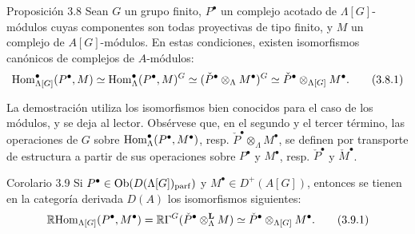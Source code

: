 \begin{statement}{Proposición 3.8}
Sean $G$ un grupo finito, $P^\bullet$ un complejo acotado de $\Lambda[G]$-módulos cuyas componentes son todas proyectivas de tipo finito, y $M$ un complejo de $A[G]$-módulos. En estas condiciones, existen isomorfismos canónicos de complejos de $A$-módulos:
\[
\operatorname{Hom}_{\Lambda[G]}^\bullet(P^\bullet,M)
\simeq \operatorname{Hom}_\Lambda^\bullet(P^\bullet,M)^G
\simeq (\check P^\bullet\otimes_\Lambda M^\bullet)^G
\simeq \check P^\bullet\otimes_{\Lambda[G]}M^\bullet.
\tag{3.8.1}
\]
\end{statement}

La demostración utiliza los isomorfismos bien conocidos para el caso de los módulos, y se deja al lector. Obsérvese que, en el segundo y el tercer término, las operaciones de $G$ sobre $\operatorname{Hom}_\Lambda^\bullet(P^\bullet,M^\bullet)$, resp. $\check P^\bullet\otimes_\Lambda M^\bullet$, se definen por transporte de estructura a partir de sus operaciones sobre $P^\bullet$ y $M^\bullet$, resp. $\check P^\bullet$ y $\check M^\bullet$.

\begin{statement}{Corolario 3.9}
Si $P^\bullet\in \operatorname{Ob}(D(\Lambda[G])_{\mathrm{parf}})$ y $M^\bullet\in D^+(A[G])$, entonces se tienen en la categoría derivada $D(A)$ los isomorfismos siguientes:
\[
\mathbb{R}\mathrm{Hom}_{\Lambda[G]}(P^\bullet,M^\bullet)
=\mathbb{R}\Gamma^G(\check P^\bullet\otimes_\Lambda^{\mathbf L}M)
\simeq \check P^\bullet\otimes_{\Lambda[G]}M^\bullet.
\tag{3.9.1}
\]
\end{statement}
